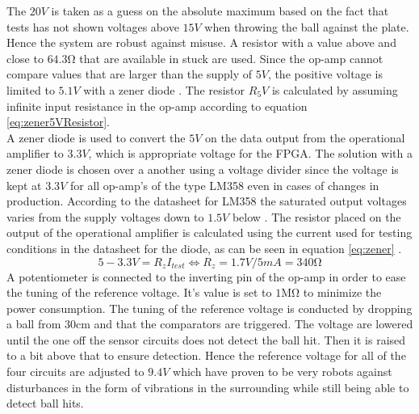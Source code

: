 The $20V$ is taken as a guess on the absolute maximum based on the fact that tests has not shown voltages above $15V$ when throwing the ball against the plate. Hence the system are robust against misuse. A resistor with a value above and close to $64.3\si{\ohm}$ that are available in stuck are used.
Since the op-amp cannot compare values that are larger than the supply of $5V$, the positive voltage is limited to $5.1V$ with a zener diode \cite{zener}. The resistor $R_5V$ is calculated by assuming infinite input resistance in the op-amp according to equation \ref{eq:zener5VResistor}.
\begin{equation}
\label{eq:zener5VResistor}
\end{equation}
A zener diode \cite{zener} is used to convert the $5V$ on the data output from the operational amplifier to $3.3V$, which is appropriate voltage for the FPGA. The solution with a zener diode is chosen over a another using a voltage divider since the voltage is kept at $3.3V$ for all op-amp's of the type LM358 even in cases of changes in production. According to the datasheet for LM358 the saturated output voltages varies from the supply voltages down to $1.5V$ below \cite{lm358}.
The resistor placed on the output of the operational amplifier is calculated using the current used for testing conditions in the datasheet for the diode, as can be seen in equation \ref{eq:zener} \cite{zener}.
\begin{equation}
5-3.3V = R_{z} I_{test} \Leftrightarrow R_{z} = 1.7V/5mA = 340\si{\ohm}
\label{eq:zener}
\end{equation}
% 
A potentiometer is connected to the inverting pin of the op-amp in order to ease the tuning of the reference voltage. It's value is set to $1\si{\mega\ohm}$ to minimize the power consumption.
The tuning of the reference voltage is conducted by dropping a ball from $30\si{\centi\meter}$  and that the comparators are triggered. The voltage are lowered until the one off the sensor circuits does not detect the ball hit. Then it is raised to a bit above that to ensure detection. Hence the reference voltage for all of the four circuits are adjusted to $9.4V$ which have proven to be very robots against disturbances in the form of vibrations in the surrounding while still being able to detect ball hits.
%
